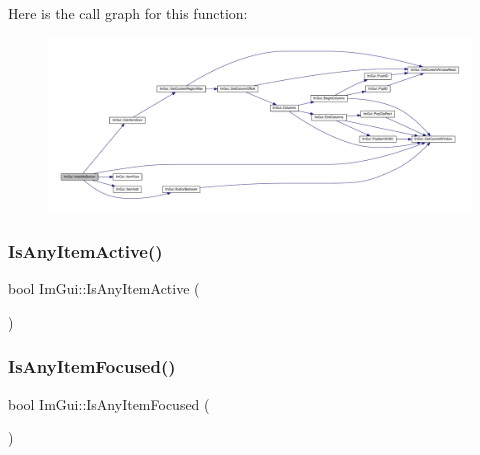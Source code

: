 Here is the call graph for this function\+:
\nopagebreak
\begin{figure}[H]
\begin{center}
\leavevmode
\includegraphics[width=350pt]{namespace_im_gui_a22668d440cbbb1f8be07241d9c6d9096_cgraph}
\end{center}
\end{figure}
\mbox{\label{namespace_im_gui_acdc18199d50d26919312db5f9707b8dc}} 
\subsubsection{\texorpdfstring{Is\+Any\+Item\+Active()}{IsAnyItemActive()}}
{\footnotesize\ttfamily bool Im\+Gui\+::\+Is\+Any\+Item\+Active (\begin{DoxyParamCaption}{ }\end{DoxyParamCaption})}

\mbox{\label{namespace_im_gui_a89514ca4c0a2b883c878736d92352656}} 
\subsubsection{\texorpdfstring{Is\+Any\+Item\+Focused()}{IsAnyItemFocused()}}
{\footnotesize\ttfamily bool Im\+Gui\+::\+Is\+Any\+Item\+Focused (\begin{DoxyParamCaption}{ }\end{DoxyParamCaption})}

\mbox{\label{namespace_im_gui_a0512146617bb55e24ebcfbe3ce6553d5}} 
